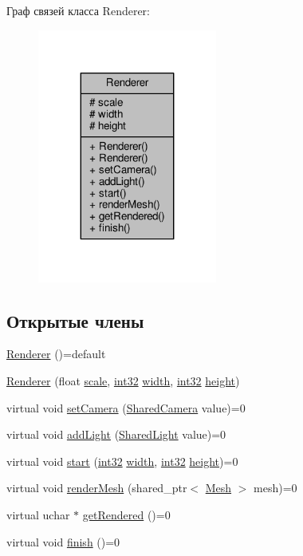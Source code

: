 Граф связей класса Renderer\+:
\nopagebreak
\begin{figure}[H]
\begin{center}
\leavevmode
\includegraphics[width=167pt]{d4/d74/class_renderer__coll__graph}
\end{center}
\end{figure}
\subsection*{Открытые члены}
\begin{DoxyCompactItemize}
\item 
\hyperlink{class_renderer_a4dddd75ab18573a3686f90225f3f03d4}{Renderer} ()=default
\item 
\hyperlink{class_renderer_ae0b9551d2d89c7bc08e962eafa43ebb0}{Renderer} (float \hyperlink{class_renderer_aeab228a83d206c55fc73c7a14a0f0761}{scale}, \hyperlink{number_8h_a43d43196463bde49cb067f5c20ab8481}{int32} \hyperlink{class_renderer_ada813defebef120813571bfb6053e88f}{width}, \hyperlink{number_8h_a43d43196463bde49cb067f5c20ab8481}{int32} \hyperlink{class_renderer_ab2e154b790a2d31603f147510c261ac2}{height})
\item 
virtual void \hyperlink{class_renderer_a832ac0e6a4fe1e840e07bd82a405edd6}{set\+Camera} (\hyperlink{camera_8h_a01f929aec8e912be07dca2c1f8d00f67}{Shared\+Camera} value)=0
\item 
virtual void \hyperlink{class_renderer_a000c8a4b55c252ad1353bbd33dc4def9}{add\+Light} (\hyperlink{light_8h_ae1ec32369be93ce20c1e9047a8d388c0}{Shared\+Light} value)=0
\item 
virtual void \hyperlink{class_renderer_a78cc00edca00b08d09121065fb4fc771}{start} (\hyperlink{number_8h_a43d43196463bde49cb067f5c20ab8481}{int32} \hyperlink{class_renderer_ada813defebef120813571bfb6053e88f}{width}, \hyperlink{number_8h_a43d43196463bde49cb067f5c20ab8481}{int32} \hyperlink{class_renderer_ab2e154b790a2d31603f147510c261ac2}{height})=0
\item 
virtual void \hyperlink{class_renderer_a40c3fe3b0e46de69ed563d4b4ca13986}{render\+Mesh} (shared\+\_\+ptr$<$ \hyperlink{class_mesh}{Mesh} $>$ mesh)=0
\item 
virtual uchar $\ast$ \hyperlink{class_renderer_ad3a00c526a6765792b02f328e7a7dad1}{get\+Rendered} ()=0
\item 
virtual void \hyperlink{class_renderer_ae8a0a67a993626066a989dbf02ae43f9}{finish} ()=0
\end{DoxyCompactItemize}
